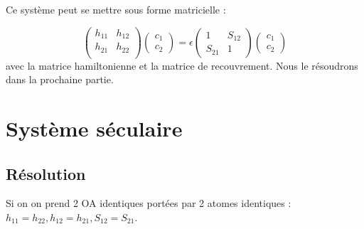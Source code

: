\documentclass[french]{yLectureNote}
\begin{document}
Ce système peut se mettre sous forme matricielle :

\[\begin{pmatrix}
h_{11} & h_{12}  \\
h_{21}& h_{22} \\
\end{pmatrix}
\begin{pmatrix}
c_1 \\ c_2
\end{pmatrix} = \epsilon \begin{pmatrix}
1&S_{12} \\ S_{21}&1
\end{pmatrix} \begin{pmatrix}
c_1 \\ c_2
\end{pmatrix}\] avec la matrice hamiltonienne et la matrice de recouvrement.
Nous le résoudrons dans la prochaine partie.
\section{Système séculaire}
%
%
\subsection{Résolution}
Si on on prend 2 OA identiques portées par 2 atomes identiques : \(h_{11} = h_{22}, h_{12} = h_{21}, S_{12} = S_{21}\).
\end{document}
